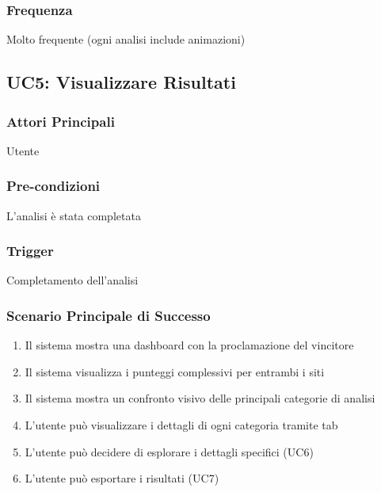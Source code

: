 \subsubsection{Frequenza}
Molto frequente (ogni analisi include animazioni)

\subsection{UC5: Visualizzare Risultati}

\subsubsection{Attori Principali}
Utente

\subsubsection{Pre-condizioni}
L'analisi è stata completata

\subsubsection{Trigger}
Completamento dell'analisi

\subsubsection{Scenario Principale di Successo}
\begin{enumerate}
    \item Il sistema mostra una dashboard con la proclamazione del vincitore
    \item Il sistema visualizza i punteggi complessivi per entrambi i siti
    \item Il sistema mostra un confronto visivo delle principali categorie di analisi
    \item L'utente può visualizzare i dettagli di ogni categoria tramite tab
    \item L'utente può decidere di esplorare i dettagli specifici (UC6)
    \item L'utente può esportare i risultati (UC7)
\end{enumerate}

